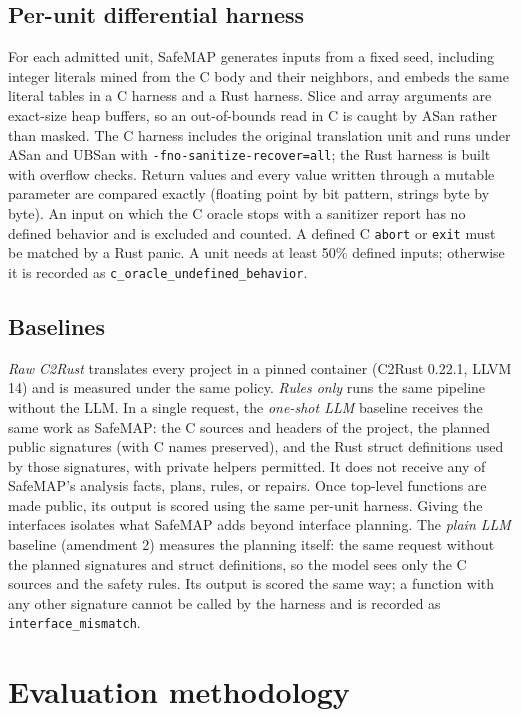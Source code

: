 \documentclass[pdflatex,sn-basic]{sn-jnl}
\newcommand{\tool}{SafeMAP\xspace}
\begin{document}
\subsection{Per-unit differential harness}
\label{sec:harness}

For each admitted unit, \tool generates inputs from a fixed seed, including
integer literals mined from the C body and their neighbors, and embeds the same
literal tables in a C harness and a Rust harness. Slice and array arguments
are exact-size heap buffers, so an out-of-bounds read in C is caught by ASan
rather than masked. The C harness includes the original translation unit and
runs under ASan and UBSan with \texttt{-fno-sanitize-recover=all}; the Rust
harness is built with overflow checks. Return values and every value written
through a mutable parameter are compared exactly (floating point by bit
pattern, strings byte by byte). An input on which the C oracle stops with a
sanitizer report has no defined behavior and is excluded and counted. A
defined C \texttt{abort} or \texttt{exit} must be matched by a Rust panic. A
unit needs at least 50\% defined inputs; otherwise it is recorded as
\texttt{c\_oracle\_undefined\_behavior}.

\subsection{Baselines}

\emph{Raw C2Rust} translates every project in a pinned container 
(C2Rust 0.22.1, LLVM 14) and is measured under the same policy. 
\emph{Rules only} runs the same pipeline without the LLM. 
In a single request, the \emph{one-shot LLM} baseline receives 
the same work as \tool: the C sources and headers of the project, 
the planned public signatures (with C names preserved), and the Rust struct 
definitions used by those signatures, with private helpers permitted. It does not 
receive any of \tool's analysis facts, plans, rules, or repairs. Once top-level functions 
are made public, its output is scored using the same per-unit harness.
Giving the interfaces isolates what \tool adds beyond interface planning.
The \emph{plain LLM} baseline (amendment 2) measures the planning itself: the
same request without the planned signatures and struct definitions, so the
model sees only the C sources and the safety rules. Its output is scored the
same way; a function with any other signature cannot be called by the
harness and is recorded as \texttt{interface\_mismatch}.

\section{Evaluation methodology}
\end{document}
